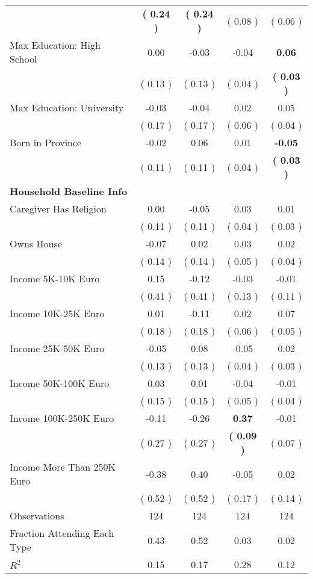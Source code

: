 \begin{table}[H]
{\begin{tabular}{lcccc}
\quad  & \textbf{(     0.24 )} & \textbf{(     0.24 )}  & (     0.08 )  & (     0.06 )  \\
\quad Max Education: High School &      0.00 &     -0.03 &     -0.04 & \textbf{     0.06} \\
\quad  & (     0.13 ) & (     0.13 )  & (     0.04 )  & \textbf{(     0.03 )}  \\
\quad Max Education: University &     -0.03 &     -0.04 &      0.02 &      0.05 \\
\quad  & (     0.17 ) & (     0.17 )  & (     0.06 )  & (     0.04 )  \\
\quad Born in Province &     -0.02 &      0.06 &      0.01 & \textbf{    -0.05} \\
\quad  & (     0.11 ) & (     0.11 )  & (     0.04 )  & \textbf{(     0.03 )}  \\
\midrule
\textbf{Household Baseline Info} \\
\quad Caregiver Has Religion &      0.00 &     -0.05 &      0.03 &      0.01 \\
\quad  & (     0.11 ) & (     0.11 )  & (     0.04 )  & (     0.03 )  \\
\quad Owns House &     -0.07 &      0.02 &      0.03 &      0.02 \\
\quad  & (     0.14 ) & (     0.14 )  & (     0.05 )  & (     0.04 )  \\
\quad Income 5K-10K Euro &      0.15 &     -0.12 &     -0.03 &     -0.01 \\
\quad  & (     0.41 ) & (     0.41 )  & (     0.13 )  & (     0.11 )  \\
\quad Income 10K-25K Euro &      0.01 &     -0.11 &      0.02 &      0.07 \\
\quad  & (     0.18 ) & (     0.18 )  & (     0.06 )  & (     0.05 )  \\
\quad Income 25K-50K Euro &     -0.05 &      0.08 &     -0.05 &      0.02 \\
\quad  & (     0.13 ) & (     0.13 )  & (     0.04 )  & (     0.03 )  \\
\quad Income 50K-100K Euro &      0.03 &      0.01 &     -0.04 &     -0.01 \\
\quad  & (     0.15 ) & (     0.15 )  & (     0.05 )  & (     0.04 )  \\
\quad Income 100K-250K Euro &     -0.11 &     -0.26 & \textbf{     0.37} &     -0.01 \\
\quad  & (     0.27 ) & (     0.27 )  & \textbf{(     0.09 )}  & (     0.07 )  \\
\quad Income More Than 250K Euro &     -0.38 &      0.40 &     -0.05 &      0.02 \\
\quad  & (     0.52 ) & (     0.52 )  & (     0.17 )  & (     0.14 )  \\
\midrule
Observations & 124 & 124 & 124 & 124 \\
Fraction Attending Each Type &      0.43 &      0.52 &      0.03 &      0.02 \\
\midrule
$ R^2$ &      0.15 &      0.17 &      0.28 &      0.12 \\
\bottomrule
\end{tabular}}
\end{table}
